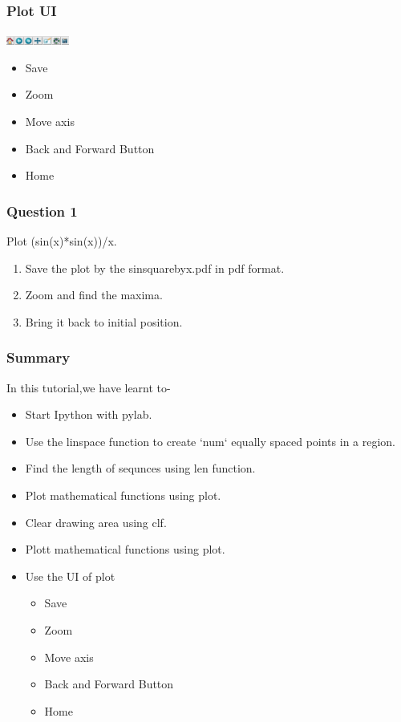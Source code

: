 \documentclass[presentation]{beamer}
\begin{document}
\begin{frame}
\frametitle{Plot UI}
\label{sec-4}

   \includegraphics[height=0.12in, interpolate=true]{buttons}

\begin{itemize}
\item Save
\item Zoom
\item Move axis
\item Back and Forward Button
\item Home
\end{itemize}
\end{frame}
\begin{frame}
\frametitle{Question 1}
\label{sec-5}

  Plot (sin(x)*sin(x))/x.

\begin{enumerate}
\item Save the plot by the sinsquarebyx.pdf in pdf format.
\item Zoom and find the maxima.
\item Bring it back to initial position.
\end{enumerate}
\end{frame}
\begin{frame}
\frametitle{Summary}
\label{sec-6}

  In this tutorial,we have learnt to-

\begin{itemize}
\item Start Ipython with pylab.
\item Use the linspace function to create `num` equally spaced points in a region.
\item Find the length of sequnces using len function.
\item Plot mathematical functions using plot.
\item Clear drawing area using clf.
\item Plott mathematical functions using plot.
\item Use the UI of plot
\begin{itemize}
\item Save
\item Zoom
\item Move axis
\item Back and Forward Button
\item Home
\end{itemize}
\end{itemize}
 
\end{frame}
\end{document}
